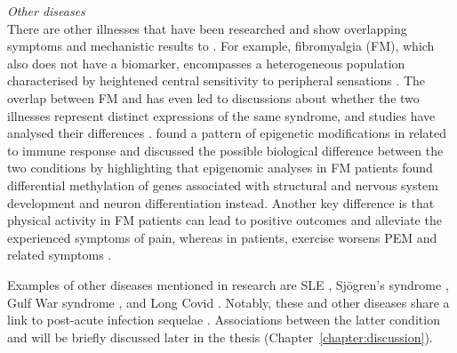 \bsni
\textit{Other diseases}\\
\noindent
There are other illnesses that have been researched and show overlapping symptoms and mechanistic results to \cfs.
For example, fibromyalgia (FM), which also does not have a biomarker, encompasses a heterogeneous population characterised by heightened central sensitivity to peripheral sensations \citep{kodner2015CommonQuestions}.
The overlap between FM and \cfs has even led to discussions about whether the two illnesses represent distinct expressions of the same syndrome, and studies have analysed their differences \citep{abbiChronicFatigueSyndrome2012, castro-marrero2013CouldMitochondrial}.
\citet{vegaDNAMethylationModifications2014} found a pattern of epigenetic modifications in \cfs related to immune response and discussed the possible biological difference between the two conditions by highlighting that epigenomic analyses in FM patients found differential methylation of genes associated with structural and nervous system development and neuron differentiation instead.
Another key difference is that physical activity in FM patients can lead to positive outcomes and alleviate the experienced symptoms of pain, whereas in \cfs patients, exercise worsens PEM and related symptoms \citep{hauser2010EfficacyDifferent, kodner2015CommonQuestions}.

Examples of other diseases mentioned in \cfs research are SLE \citep{sotznyMyalgicEncephalomyelitisChronic2018}, Sj\"{o}gren's syndrome \citep{calabrese1994ChronicFatigue, kim2023CharacterizingSjogrenAssociated}, Gulf War syndrome \citep{kang2003PosttraumaticStress, halpin2017MyalgicEncephalomyelitis}, and Long Covid \citep{komaroff2023MECFS, gil2023IdentificationCD8}.
Notably, these and other diseases share a link to post-acute infection sequelae \citep{choutka2022UnexplainedPostacute}.
Associations between the latter condition and \cfs will be briefly discussed later in the thesis (Chapter~\ref{chapter:discussion}).


